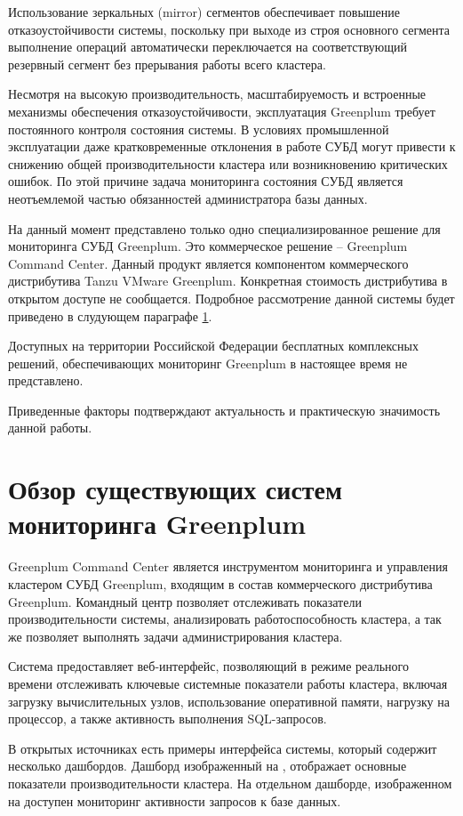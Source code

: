 Использование зеркальных (mirror) сегментов обеспечивает повышение отказоустойчивости системы, поскольку при выходе из строя основного сегмента выполнение операций автоматически переключается на соответствующий резервный сегмент без прерывания работы всего кластера.

Несмотря на высокую производительность, масштабируемость и встроенные механизмы обеспечения отказоустойчивости, эксплуатация Greenplum требует постоянного контроля состояния системы. В условиях промышленной эксплуатации даже кратковременные отклонения в работе СУБД могут привести к снижению общей производительности кластера или возникновению критических ошибок. По этой причине задача мониторинга состояния СУБД является неотъемлемой частью обязанностей администратора базы данных.

На данный момент представлено только одно специализированное решение для мониторинга СУБД Greenplum. Это коммерческое решение -- Greenplum Command Center. Данный продукт является компонентом коммерческого дистрибутива Tanzu VMware Greenplum. Конкретная стоимость дистрибутива в открытом доступе не сообщается. Подробное рассмотрение данной системы будет приведено в слудующем параграфе  \ref{ch1:sec2}.

Доступных на территории Российской Федерации бесплатных комплексных решений, обеспечивающих мониторинг Greenplum в настоящее время не представлено. 

Приведенные факторы подтверждают актуальность и практическую значимость данной работы.

\section{Обзор существующих систем мониторинга Greenplum} \label{ch1:sec2}

Greenplum Command Center является инструментом мониторинга и управления кластером СУБД Greenplum, входящим в состав коммерческого дистрибутива Greenplum. Командный центр позволяет отслеживать показатели производительности системы, анализировать работоспособность кластера, а так же позволяет  выполнять задачи администрирования кластера.

Система предоставляет веб-интерфейс, позволяющий в режиме реального времени отслеживать ключевые системные показатели работы кластера, включая загрузку вычислительных узлов, использование оперативной памяти, нагрузку на процессор, а также активность выполнения SQL-запросов.

В открытых источниках есть примеры интерфейса системы, который содержит несколько дашбордов. Дашборд изображенный на , отображает основные показатели производительности кластера. На отдельном дашборде, изображенном на  доступен мониторинг активности запросов к базе данных.

